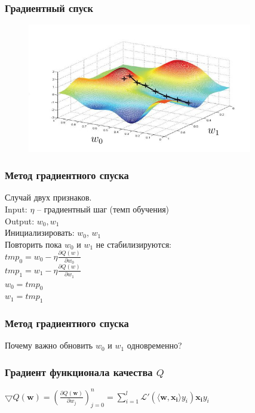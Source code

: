 \documentclass[12pt]{beamer}
\begin{document}
\begin{frame}\frametitle{Градиентный спуск}
\begin{figure}[htbp]
  \includegraphics[height=160pt, keepaspectratio = true]{images/gradient_descent}   
\end{figure}
\end{frame}

\begin{frame}\frametitle{Метод градиентного спуска}
Случай двух признаков.\\
Input: $\eta$ -- градиентный шаг (темп обучения)\\
Output: $w_0, w_1$\\
\vspace{3mm}	
Инициализировать: $w_0$, $w_1$\\
Повторить пока $w_0$ и $w_1$ не стабилизируются:\\
\hspace{10mm} $tmp_0 =  w_0 - \eta \frac{\partial Q(w)}{\partial w_0}$\\
\hspace{10mm} $tmp_1 =  w_1 - \eta \frac{\partial Q(w)}{\partial w_1}$\\
\hspace{10mm} $w_0 = tmp_0$\\
\hspace{10mm} $w_1 = tmp_1$
\end{frame}

\begin{frame}\frametitle{Метод градиентного спуска}
Почему важно обновить $w_0$ и $w_1$ одновременно?
\end{frame}

\begin{frame}\frametitle{Градиент функционала качества $Q$}
$\bigtriangledown Q(\mathbf{w}) = (\frac{\partial Q(\mathbf{w})}{\partial w_j})_{j=0}^n = \sum\limits_{i=1}^l \mathcal{L}'(\langle \mathbf{w}, \mathbf{x_i} \rangle y_i) \mathbf{x_i} y_i$\\
\end{frame}
\end{document}
